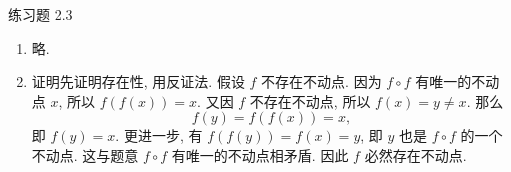 \documentclass[12pt]{article}
\begin{document}
\pagestyle{empty}

\begin{center}
    {\heiti 练习题 2.3}
\end{center}

\begin{enumerate}
    \item %
        略.
    \item %
        {\heiti 证明}\quad 先证明存在性, 用反证法. 假设 $f$ 不存在不动点. 因为 $f \circ f$ 有唯一的不动点 $x$,
        所以 $f(f(x)) = x$. 又因 $f$ 不存在不动点, 所以 $f(x) = y \ne x$. 那么
        \[
            f(y) = f(f(x)) = x,   
        \]
        即 $f(y) = x$. 更进一步, 有 $f(f(y)) = f(x) = y$, 即 $y$ 也是 $f \circ f$ 的一个不动点. 这与题意 $f \circ f$ 有唯一的不动点相矛盾.
        因此 $f$ 必然存在不动点.
        

\end{enumerate}
\end{document}
